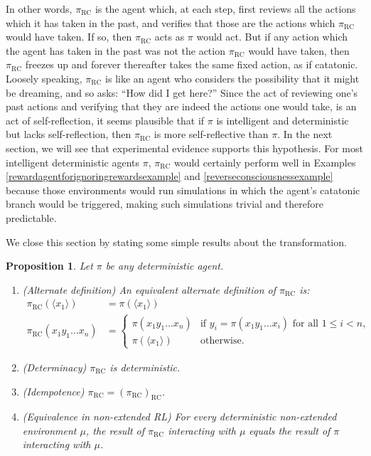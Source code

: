 \documentclass{article}
\newtheorem{myproposition}[mytheorem]{Proposition}
\def\RC{\textrm{RC}}
\begin{document}
In other words, $\pi_{\RC}$ is the agent which, at each step, first reviews all the actions
which it has taken in the past, and verifies that those are the actions which $\pi_{\RC}$ would
have taken. If so, then $\pi_{\RC}$ acts as $\pi$ would act. But if any action which
the agent has taken in the past was not the action $\pi_{\RC}$ would have taken, then
$\pi_{\RC}$ freezes up and forever thereafter takes the same fixed action, as if catatonic.
Loosely speaking, $\pi_{\RC}$ is like an agent who considers the possibility that it might
be dreaming, and so asks: ``How did I get here?''
Since the act of reviewing one's past actions and verifying that they are indeed the actions
one would take, is an act of self-reflection, it seems plausible that if $\pi$
is intelligent and deterministic but lacks self-reflection, then $\pi_{\RC}$ is
more self-reflective than $\pi$. In the next section, we will see that experimental
evidence supports this hypothesis.
For most intelligent deterministic agents $\pi$, $\pi_{\RC}$ would certainly perform well in
Examples \ref{rewardagentforignoringrewardsexample} and
\ref{reverseconsciousnessexample} because those environments would
run simulations in which the agent's catatonic branch would be triggered,
making such simulations trivial and therefore predictable.

We close this section by stating some simple results
about the transformation.

\begin{myproposition}
\label{transformationproposition}
  Let $\pi$ be any deterministic agent.
  \begin{enumerate}
    \item
    (Alternate definition)
    An equivalent alternate definition of $\pi_{\RC}$ is:
    \begin{align*}
      \pi_{\RC}(\langle x_1\rangle) &= \pi(\langle x_1\rangle)\\
      \pi_{\RC}(x_1y_1\ldots x_n) &=
      \begin{cases}
        \pi(x_1y_1\ldots x_n) & \mbox{if $y_i=\pi(x_1y_1\ldots x_i)$ for all $1\leq i<n$,}\\
        \pi(\langle x_1\rangle) & \mbox{otherwise.}
      \end{cases}
    \end{align*}
    \item
    (Determinacy)
    $\pi_{\RC}$ is deterministic.
    \item
    (Idempotence) $\pi_{\RC}=(\pi_{\RC})_{\RC}$.
    \item
    (Equivalence in non-extended RL)
    For every deterministic non-extended environment $\mu$, the result of $\pi_{\RC}$
    interacting with $\mu$ equals the result of $\pi$ interacting with $\mu$.
  \end{enumerate}
\end{myproposition}
\end{document}
